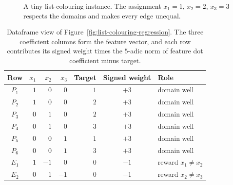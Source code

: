 \documentclass[11pt]{article}
\begin{document}
\begin{figure}[H]
\centering
{}
\caption{A tiny list-colouring instance. The assignment \(x_1=1\), \(x_2=2\), \(x_3=3\) respects the domains and makes every edge unequal.}
\label{fig:list-colouring-example}
\end{figure}

\begin{table}[t]
\centering
\small
\begin{tabular}{@{}crrrrc l@{}}
\toprule
Row & $x_1$ & $x_2$ & $x_3$ & Target & Signed weight & Role \\
\midrule
$P_1$ & $1$ & $0$ & $0$ & $1$ & $+3$ & domain well \\
$P_2$ & $1$ & $0$ & $0$ & $2$ & $+3$ & domain well \\
$P_3$ & $0$ & $1$ & $0$ & $2$ & $+3$ & domain well \\
$P_4$ & $0$ & $1$ & $0$ & $3$ & $+3$ & domain well \\
$P_5$ & $0$ & $0$ & $1$ & $1$ & $+3$ & domain well \\
$P_6$ & $0$ & $0$ & $1$ & $3$ & $+3$ & domain well \\
$E_1$ & $1$ & $-1$ & $0$ & $0$ & $-1$ & reward $x_1\ne x_2$ \\
$E_2$ & $0$ & $1$ & $-1$ & $0$ & $-1$ & reward $x_2\ne x_3$ \\
\bottomrule
\end{tabular}
\caption{Dataframe view of Figure~\ref{fig:list-colouring-regression}. The three coefficient columns form the feature vector, and each row contributes its signed weight times the \(5\)-adic norm of feature dot coefficient minus target.}
\label{tab:list-colouring-dataframe}
\end{table}
\end{document}
